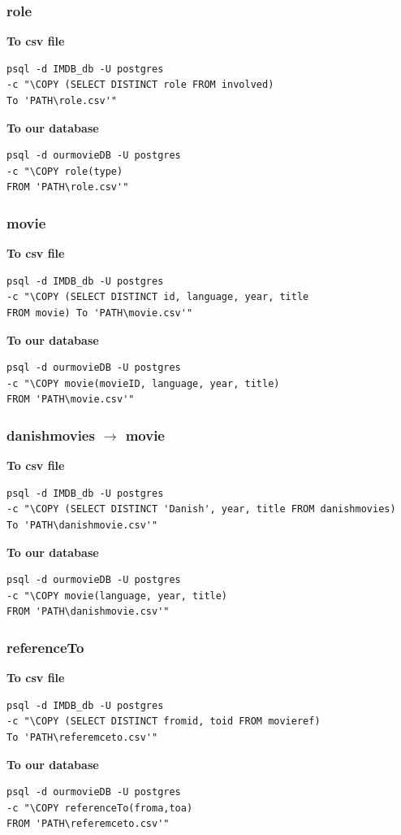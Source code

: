 \documentclass[10pt,a4paper,final]{report}
\begin{document}
\subsubsection*{role}
\textbf{To csv file}
\begin{lstlisting}
psql -d IMDB_db -U postgres 
-c "\COPY (SELECT DISTINCT role FROM involved) 
To 'PATH\role.csv'"
\end{lstlisting}
\textbf{To our database}
\begin{lstlisting}
psql -d ourmovieDB -U postgres 
-c "\COPY role(type) 
FROM 'PATH\role.csv'"
\end{lstlisting}

\subsubsection*{movie}
\textbf{To csv file}
\begin{lstlisting}
psql -d IMDB_db -U postgres 
-c "\COPY (SELECT DISTINCT id, language, year, title 
FROM movie) To 'PATH\movie.csv'"
\end{lstlisting}
\textbf{To our database}
\begin{lstlisting}
psql -d ourmovieDB -U postgres 
-c "\COPY movie(movieID, language, year, title) 
FROM 'PATH\movie.csv'"
\end{lstlisting}

\subsubsection*{danishmovies $\rightarrow$ movie}
\textbf{To csv file}
\begin{lstlisting}
psql -d IMDB_db -U postgres 
-c "\COPY (SELECT DISTINCT 'Danish', year, title FROM danishmovies) 
To 'PATH\danishmovie.csv'"
\end{lstlisting}
\textbf{To our database}
\begin{lstlisting}
psql -d ourmovieDB -U postgres 
-c "\COPY movie(language, year, title) 
FROM 'PATH\danishmovie.csv'"
\end{lstlisting}

\subsubsection*{referenceTo}
\textbf{To csv file}
\begin{lstlisting}
psql -d IMDB_db -U postgres 
-c "\COPY (SELECT DISTINCT fromid, toid FROM movieref) 
To 'PATH\referemceto.csv'"
\end{lstlisting}
\textbf{To our database}
\begin{lstlisting}
psql -d ourmovieDB -U postgres 
-c "\COPY referenceTo(froma,toa) 
FROM 'PATH\referemceto.csv'"
\end{lstlisting}
\end{document}
